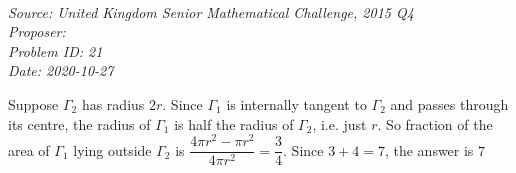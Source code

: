 \SSbreak\\
\emph{Source: United Kingdom Senior Mathematical Challenge, 2015 Q4}\\
\emph{Proposer: \Pbrain}\\
\emph{Problem ID: 21}\\
\emph{Date: 2020-10-27}\\
\SSbreak

\bigskip

\begin{solution}\hfil\medskip

    Suppose $\Gamma_2$ has radius $2r$. Since $\Gamma_1$ is internally tangent to $\Gamma_2$ and passes through its centre, the radius of $\Gamma_1$ is half the radius of $\Gamma_2$, i.e. just $r$. So fraction of the area of $\Gamma_1$ lying outside $\Gamma_2$ is $\dfrac{4\pi r^2 - \pi r^2}{4 \pi r^2} = \dfrac{3}{4}$. Since $3 + 4 = 7$, the answer is $\boxed{7}$
\end{solution}\bigskip
